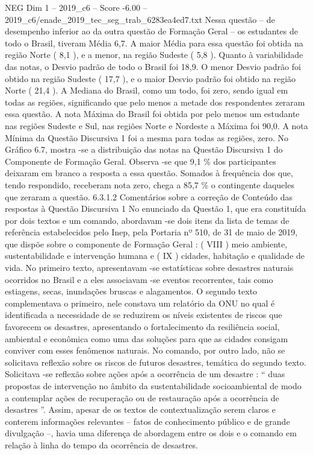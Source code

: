 \begin{textsample}{NEG Dim 1 – 2019\_c6 – Score -6.00 – 2019\_c6/enade\_2019\_tec\_seg\_trab\_6283ea4ed7.txt}
Nessa questão – de desempenho inferior ao da outra questão de Formação Geral – os estudantes de todo o Brasil, tiveram Média 6,7.
A maior Média para essa questão foi obtida na região Norte ( 8,1 ), e a menor, na região Sudeste ( 5,8 ).
Quanto à variabilidade das notas, o Desvio padrão de todo o Brasil foi 18,9.
O menor Desvio padrão foi obtido na região Sudeste ( 17,7 ), e o maior Desvio padrão foi obtido na região Norte ( 21,4 ).
A Mediana do Brasil, como um todo, foi zero, sendo igual em todas as regiões, significando que pelo menos a metade dos respondentes zeraram essa questão.
A nota Máxima do Brasil foi obtida por pelo menos um estudante nas regiões Sudeste e Sul, nas regiões Norte e Nordeste a Máxima foi 90,0.
A nota Mínima da Questão Discursiva 1 foi a mesma para todas as regiões, zero.
No Gráfico 6.7, mostra -se a distribuição das notas na Questão Discursiva 1 do Componente de Formação Geral.
Observa -se que 9,1 \% dos participantes deixaram em branco a resposta a essa questão.
Somados à frequência dos que, tendo respondido, receberam nota zero, chega a 85,7 \% o contingente daqueles que zeraram a questão. 6.3.1.2 Comentários sobre a correção de Conteúdo das respostas à Questão Discursiva 1 No enunciado da Questão 1, que era constituída por dois textos e um comando, abordavam -se dois itens da lista de temas de referência estabelecidos pelo Inep, pela Portaria nº 510, de 31 de maio de 2019, que dispõe sobre o componente de Formação Geral : ( VIII ) meio ambiente, sustentabilidade e intervenção humana e ( IX ) cidades, habitação e qualidade de vida.
No primeiro texto, apresentavam -se estatísticas sobre desastres naturais ocorridos no Brasil e a eles associavam -se eventos recorrentes, tais como estiagens, secas, inundações bruscas e alagamentos.
O segundo texto complementava o primeiro, nele constava um relatório da ONU no qual é identificada a necessidade de se reduzirem os níveis existentes de riscos que favorecem os desastres, apresentando o fortalecimento da resiliência social, ambiental e econômica como uma das soluções para que as cidades consigam conviver com esses fenômenos naturais.
No comando, por outro lado, não se solicitava reflexão sobre os riscos de futuros desastres, temática do segundo texto.
Solicitava -se reflexão sobre ações após a ocorrência de um desastre : “ duas propostas de intervenção no âmbito da sustentabilidade socioambiental de modo a contemplar ações de recuperação ou de restauração após a ocorrência de desastres ”.
Assim, apesar de os textos de contextualização serem claros e conterem informações relevantes – fatos de conhecimento público e de grande divulgação –, havia uma diferença de abordagem entre os dois e o comando em relação à linha do tempo da ocorrência de desastres.

\end{textsample}

